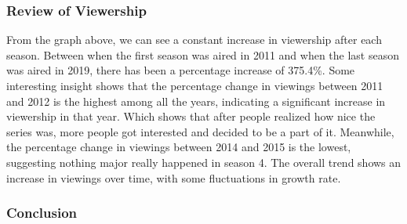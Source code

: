 \documentclass[
  letterpaper,
  DIV=11,
  numbers=noendperiod]{scrartcl}
\begin{document}
\hypertarget{review-of-viewership}{%
\subsubsection{\texorpdfstring{\textbf{Review of
Viewership}}{Review of Viewership}}\label{review-of-viewership}}

From the graph above, we can see a constant increase in viewership after
each season. Between when the first season was aired in 2011 and when
the last season was aired in 2019, there has been a percentage increase
of 375.4\%. Some interesting insight shows that the percentage change in
viewings between 2011 and 2012 is the highest among all the years,
indicating a significant increase in viewership in that year. Which
shows that after people realized how nice the series was, more people
got interested and decided to be a part of it. Meanwhile, the percentage
change in viewings between 2014 and 2015 is the lowest, suggesting
nothing major really happened in season 4. The overall trend shows an
increase in viewings over time, with some fluctuations in growth rate.

\hypertarget{conclusion}{%
\subsubsection{\texorpdfstring{\textbf{Conclusion}}{Conclusion}}\label{conclusion}}
\end{document}
